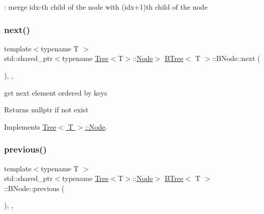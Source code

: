 \+: merge idx-\/th child of the node with (idx+1)th child of the node \mbox{\label{classBTree_1_1BNode_a8440e89eab5284dc118c00de4e7e619b}} 
\subsubsection{\texorpdfstring{next()}{next()}}
{\footnotesize\ttfamily template$<$typename T $>$ \\
std\+::shared\+\_\+ptr$<$typename \hyperlink{classTree}{Tree}$<$T$>$\+::\hyperlink{classTree_1_1Node}{Node}$>$ \hyperlink{classBTree}{B\+Tree}$<$ T $>$\+::B\+Node\+::next (\begin{DoxyParamCaption}{ }\end{DoxyParamCaption})\hspace{0.3cm}{\ttfamily [override]}, {\ttfamily [virtual]}, {\ttfamily [noexcept]}}



get next element ordered by keys 

\begin{DoxyReturn}{Returns}
nullptr if not exist 
\end{DoxyReturn}


Implements \hyperlink{classTree_1_1Node_a50f15b262b0d6c572904be68ba067ca6}{Tree$<$ T $>$\+::\+Node}.

\mbox{\label{classBTree_1_1BNode_aa3909dab0e45cf56b602705b8720e7c0}} 
\subsubsection{\texorpdfstring{previous()}{previous()}}
{\footnotesize\ttfamily template$<$typename T $>$ \\
std\+::shared\+\_\+ptr$<$typename \hyperlink{classTree}{Tree}$<$T$>$\+::\hyperlink{classTree_1_1Node}{Node}$>$ \hyperlink{classBTree}{B\+Tree}$<$ T $>$\+::B\+Node\+::previous (\begin{DoxyParamCaption}{ }\end{DoxyParamCaption})\hspace{0.3cm}{\ttfamily [override]}, {\ttfamily [virtual]}, {\ttfamily [noexcept]}}



